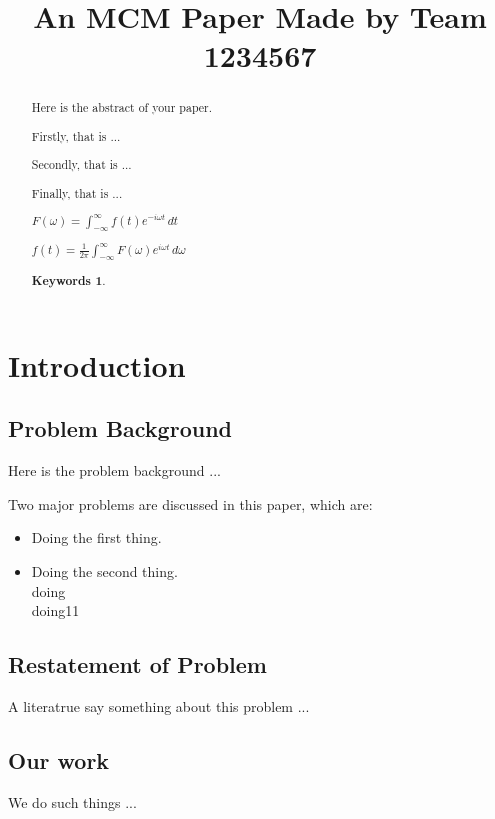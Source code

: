 \documentclass[12pt]{article}  %
\title{An MCM Paper Made by Team 1234567}  %
\newtheorem{keywords}{Keywords}
\begin{document}
\begin{abstract}
    Here is the abstract of your paper.

    Firstly, that is ...

    Secondly, that is ...

    Finally, that is ...

$F(\omega) = \int_{-\infty}^{\infty} f(t) e^{-i \omega t} \, dt$


$f(t) = \frac{1}{2\pi} \int_{-\infty}^{\infty} F(\omega) e^{i \omega t} \, d\omega$

\begin{keywords}
\end{keywords}
\end{abstract}

\maketitle  %
\tableofcontents  %


\section{Introduction}
\subsection{Problem Background}
Here is the problem background ...

Two major problems are discussed in this paper, which are:
\begin{itemize}
    \item Doing the first thing.
    \item Doing the second thing.\\doing\\    doing11
    
\end{itemize}

\subsection{Restatement of Problem}
A literatrue\cite{1} say something about this problem ...

\subsection{Our work}
We do such things ...
\end{document}
